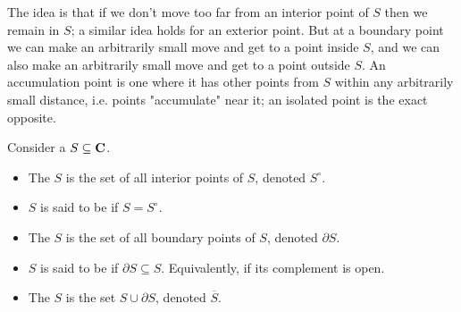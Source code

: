 
\begin{remark}
The idea is that if we don't move too far from an interior point of $S$ then we remain in $S$; a similar idea holds for an exterior point. But at a boundary point we can make an arbitrarily small move and get to a point inside $S$, and we can also make an arbitrarily small move and get to a point outside $S$. An accumulation point is one where it has other points from $S$ within any arbitrarily small distance, i.e. points "accumulate" near it; an isolated point is the exact opposite.
\end{remark}

\medskip

\begin{definition}
Consider a $S \subseteq \mathbf C$.
\begin{itemize}
\item The  {\color{darkred}$S$} is the set of all interior points of $S$, denoted $S^\circ$.
\item $S$ is said to be  if $S = S^\circ$.
\item The  {\color{darkred}$S$} is the set of all boundary points of $S$, denoted $\partial S$.
\item $S$ is said to be  if $\partial S \subseteq S$. Equivalently, if its complement is open.
\item The  {\color{darkred}$S$} is the set $S \cup \partial S$, denoted $\overline{S}$.
\end{itemize}
\end{definition}

\medskip

